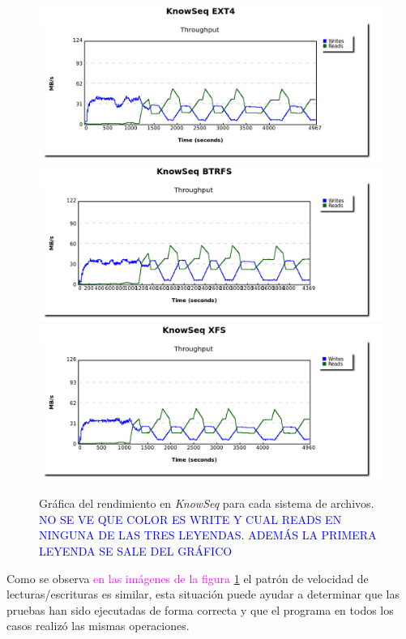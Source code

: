 \begin{figure}[H]
    \centering
    \includegraphics[scale=0.35]{doc/assets/images/Capitulo4/Knowseq/knowseq_ext4.png}
    \includegraphics[scale=0.35]{doc/assets/images/Capitulo4/Knowseq/knowseq_btrfs.png}
    \includegraphics[scale=0.35]{doc/assets/images/Capitulo4/Knowseq/knowseq_xfs.png}
    \caption{Gráfica del rendimiento en \textit{KnowSeq} para cada sistema de archivos.  \textcolor{blue}{NO SE VE QUE COLOR ES WRITE Y CUAL READS EN NINGUNA DE LAS TRES LEYENDAS. ADEMÁS LA PRIMERA LEYENDA SE SALE DEL GRÁFICO}}
    \label{fig:graf_rend_knowseq_iowatcher}
\end{figure}

Como se observa \textcolor{magenta}{ en las imágenes de la figura \ref{fig:graf_rend_knowseq_iowatcher}} %
el patrón de velocidad de lecturas/escrituras es similar, esta situación puede ayudar a determinar que las pruebas han sido ejecutadas de forma correcta y que el programa en todos los casos realizó las mismas operaciones.

